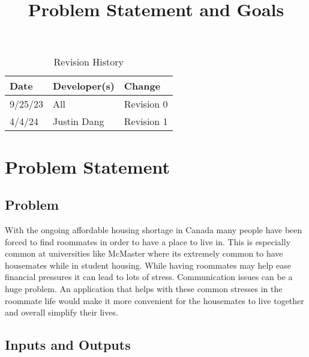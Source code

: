 \documentclass{article}
\title{Problem Statement and Goals\\\progname}
\author{\authname}
\date{}
\begin{document}
\maketitle

\begin{table}[hp]
\caption{Revision History} \label{TblRevisionHistory}
\begin{tabularx}{\textwidth}{llX}
\toprule
\textbf{Date} & \textbf{Developer(s)} & \textbf{Change}\\
\midrule
9/25/23 & All & Revision 0\\
4/4/24 & Justin Dang & Revision 1\\
\bottomrule
\end{tabularx}
\end{table}

\section{Problem Statement}



\subsection{Problem}

With the ongoing affordable housing shortage in Canada many people have been forced to find roommates in order to have a place to live in. This is especially common at universities like McMaster where its extremely common to have housemates while in student housing. While having roommates may help ease financial pressures it can lead to lots of stress. Communication issues can be a huge problem. An application that helps with these common stresses in the roommate life would make it more convenient  for the housemates to live together and overall simplify their lives.


\subsection{Inputs and Outputs}
\end{document}
